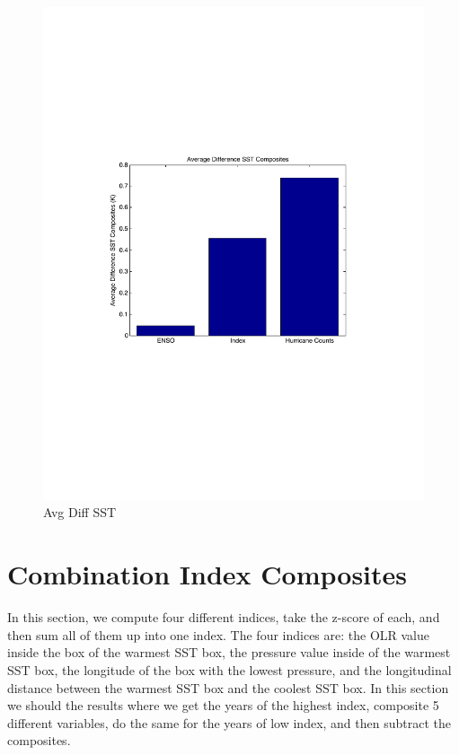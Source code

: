\documentclass[]{article}
\begin{document}
\begin{figure}[ht]
\begin{minipage}[b]{0.6\linewidth}
\includegraphics[width=\textwidth]{figures/sensitivityResults/compositeBarGraphs/sstBarGraph.pdf}
\caption{Avg Diff SST}
\label{fig:figure32}
\end{minipage}
\end{figure}

\section{Combination Index Composites}
In this section, we compute four different indices, take the z-score of each, and then sum all of them up into one index.  The four indices are: the OLR value inside the box of the warmest SST box, the pressure value inside of the warmest SST box, the longitude of the box with the lowest pressure, and the longitudinal distance between the warmest SST box and the coolest SST box.  In this section we should the results where we get the years of the highest index, composite 5 different variables, do the same for the years of low index, and then subtract the composites.
\newpage
\end{document}
